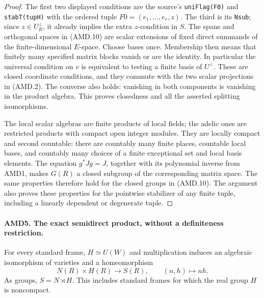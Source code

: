 \documentclass[11pt,a4paper]{article}
\numberwithin{equation}{section}
\theoremstyle{remark}\newtheorem{remark}[theorem]{Remark}
\begin{document}
\begin{proof}
The first two displayed conditions are the source's
\texttt{uni\allowbreak Flag(F0)} and \texttt{stab\allowbreak T(tup\allowbreak H)} with the ordered
tuple \(F0=(e_1,\ldots,e_r,z)\).  The third is its
\texttt{Nsub}; since \(z\in U_R^\perp\), it already implies
the extra \(z\)-condition in \(S\).  The spans and orthogonal
spaces in (AMD.10) are scalar extensions of fixed direct
summands of the finite-dimensional \(E\)-space.  Choose bases
once.  Membership then means that finitely many specified matrix
blocks vanish or are the identity.  In particular the universal
condition on \(v\) is equivalent to testing a finite basis of
\(U^\perp\).  These are closed coordinate conditions, and
they commute with the two scalar projections in (AMD.2).
The converse also holds: vanishing in both components is
vanishing in the product algebra.  This proves closedness and
all the asserted splitting isomorphisms.

The local scalar algebras are finite products of local fields;
the adelic ones are restricted products with compact open
integer modules.  They are locally compact and second countable:
there are countably many finite places, countable local bases,
and countably many choices of a finite exceptional set and local
basis elements.  The equation \(g^*Jg=J\), together with its
polynomial inverse from AMD1, makes \(G(R)\) a closed subgroup
of the corresponding matrix space.  The same properties therefore
hold for the closed groups in (AMD.10).  The argument also proves
these properties for the pointwise stabilizer of any finite
tuple, including a linearly dependent or degenerate tuple.
\end{proof}

\paragraph{AMD5. The exact semidirect product, without a definiteness restriction.}
\label{claim:AMD5}
For every standard frame, \(H\simeq U(W)\) and multiplication
induces an algebraic isomorphism of varieties and a homeomorphism
\[
                    N(R)\times H(R)\longrightarrow S(R),
                    \qquad(n,h)\longmapsto nh.
 \tag{AMD.11}
\]
As groups, \(S=N\rtimes H\).  This includes standard frames
for which the real group \(H\) is noncompact.
\end{document}
